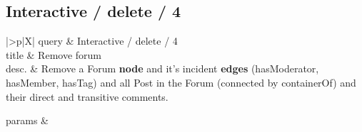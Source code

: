 \renewcommand*{\arraystretch}{1.1}

\subsection{Interactive / delete / 4}
\label{sec:interactive-delete-04}

\let\oldemph\emph
\renewcommand{\emph}[1]{{\footnotesize \sf #1}}

\renewcommand{\currentQueryCard}{4}


\noindent\begin{tabularx}{\queryCardWidth}{|>{\queryPropertyCell}p{\queryPropertyCellWidth}|X|}
	\hline
	query & Interactive / delete / 4 \\ \hline
%
	title & Remove forum \\ \hline
%
%
	desc. & Remove a \emph{Forum} \textbf{node} and it's incident \textbf{edges} (\emph{hasModerator}, \emph{hasMember}, \emph{hasTag}) and all \emph{Post} in the \emph{Forum} (connected by \emph{containerOf}) and their direct and transitive comments. 
 \\ \hline
%
	
		params &
		\innerCardVSpace \\ \hline
	
%
	
%
\end{tabularx}
\queryCardVSpace

\let\emph\oldemph
